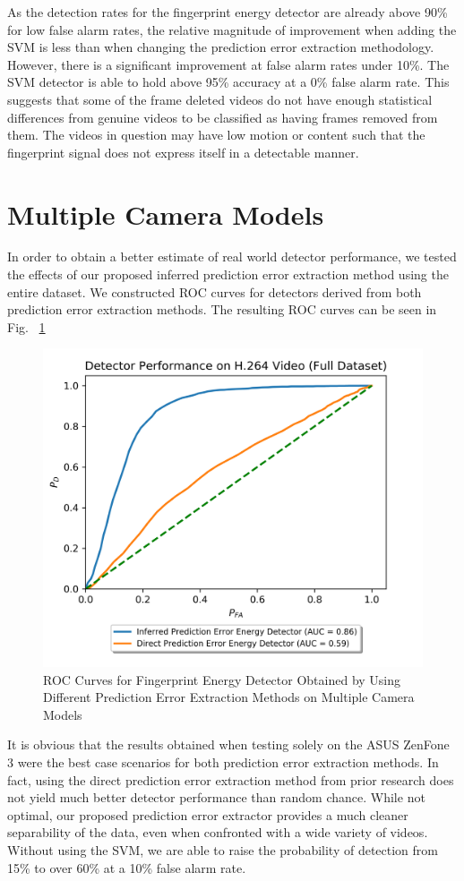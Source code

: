 As the detection rates for the fingerprint energy detector are already above 90\% for low false alarm rates, the relative magnitude of improvement when adding the SVM is less than when changing the prediction error extraction methodology. However, there is a significant improvement at false alarm rates under 10\%. The SVM detector is able to hold above 95\% accuracy at a 0\% false alarm rate. This suggests that some of the frame deleted videos do not have enough statistical differences from genuine videos to be classified as having frames removed from them. The videos in question may have low motion or content such that the fingerprint signal does not express itself in a detectable manner.

\section{Multiple Camera Models}

In order to obtain a better estimate of real world detector performance, we tested the effects of our proposed inferred prediction error extraction method using the entire dataset. We constructed ROC curves for detectors derived from both prediction error extraction methods. The resulting ROC curves can be seen in Fig. ~\ref{perrorExtractFullDS}

\begin{figure}[htbp]
\centerline{\includegraphics[width=0.7\linewidth]{ExperimentalResults/new_perror_extract_roc_full_ds.png}}
\caption{ROC Curves for Fingerprint Energy Detector Obtained by Using Different Prediction Error Extraction Methods on Multiple Camera Models}
\label{perrorExtractFullDS}
\end{figure} 

It is obvious that the results obtained when testing solely on the ASUS ZenFone 3 were the best case scenarios for both prediction error extraction methods. In fact, using the direct prediction error extraction method from prior research does not yield much better detector performance than random chance. While not optimal, our proposed prediction error extractor provides a much cleaner separability of the data, even when confronted with a wide variety of videos. Without using the SVM, we are able to raise the probability of detection from 15\% to over 60\% at a 10\% false alarm rate.

